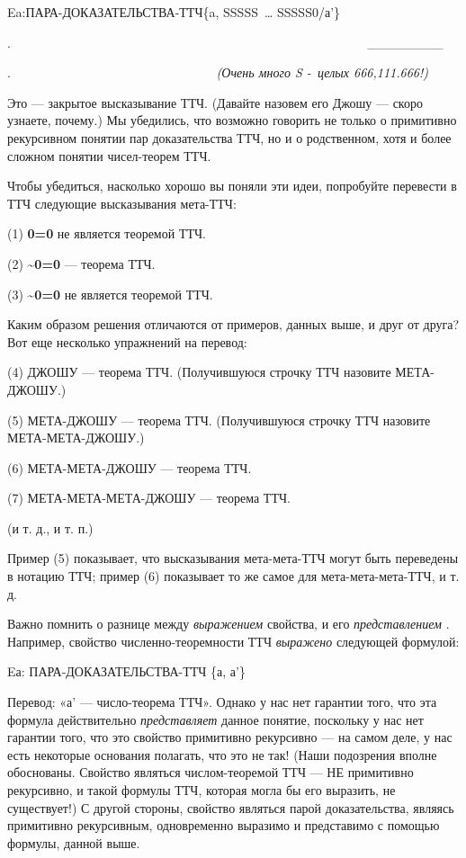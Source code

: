 \documentclass[../main.tex]{subfiles}
\begin{document}
Ea:ПАРА-ДОКАЗАТЕЛЬСТВА-ТТЧ\{a, SSSSS~\ldots{} SSSSS0/а'\}

.~~~~~~~~~~~~~~~~~~~~~~~~~~~~~~~~~~~~~~~~~~~~~~~~~~~~~~~~ \textbar\_\_\_\_\_\_\_\_\textbar~

.~~~~~~~~~~~~~~~~~~~~~~~~~~~~~~~~ \emph{(Очень много S -~целых 666,111.666!)}

Это --- закрытое высказывание ТТЧ. (Давайте назовем его Джошу --- скоро узнаете, почему.) Мы убедились, что возможно говорить не только о примитивно рекурсивном понятии пар доказательства ТТЧ, но и о родственном, хотя и более сложном понятии чисел-теорем ТТЧ.

Чтобы убедиться, насколько хорошо вы поняли эти идеи, попробуйте перевести в ТТЧ следующие высказывания мета-ТТЧ:

(1) \textbf{0=0} не является теоремой ТТЧ.

(2) \textbf{\textasciitilde0=0} --- теорема ТТЧ.

(3) \textbf{\textasciitilde0=0} не является теоремой ТТЧ.

Каким образом решения отличаются от примеров, данных выше, и друг от друга? Вот еще несколько упражнений на перевод:

(4) ДЖОШУ --- теорема ТТЧ. (Получившуюся строчку ТТЧ назовите МЕТА-ДЖОШУ.)

(5) МЕТА-ДЖОШУ --- теорема ТТЧ. (Получившуюся строчку ТТЧ назовите МЕТА-МЕТА-ДЖОШУ.)

(6) МЕТА-МЕТА-ДЖОШУ --- теорема ТТЧ.

(7) МЕТА-МЕТА-МЕТА-ДЖОШУ --- теорема ТТЧ.

(и т. д., и т. п.)

Пример (5) показывает, что высказывания мета-мета-ТТЧ могут быть переведены в нотацию ТТЧ; пример (6) показывает то же самое для мета-мета-мета-ТТЧ, и т. д.

Важно помнить о разнице между \emph{выражением} свойства, и его \emph{представлением} . Например, свойство численно-теоремности ТТЧ \emph{выражено} следующей формулой:

Eа: ПАРА-ДОКАЗАТЕЛЬСТВА-ТТЧ \{а, а'\}

Перевод: «а' --- число-теорема ТТЧ». Однако у нас нет гарантии того, что эта формула действительно \emph{представляет} данное понятие, поскольку у нас нет гарантии того, что это свойство примитивно рекурсивно --- на самом деле, у нас есть некоторые основания полагать, что это не так! (Наши подозрения вполне обоснованы. Свойство являться числом-теоремой ТТЧ --- НЕ примитивно рекурсивно, и такой формулы ТТЧ, которая могла бы его выразить, не существует!) С другой стороны, свойство являться парой доказательства, являясь примитивно рекурсивным, одновременно выразимо и представимо с помощью формулы, данной выше.
\end{document}
